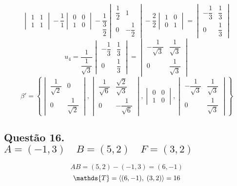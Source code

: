 \documentclass[12pt]{article}
\begin{document}
\[\begin{vmatrix} 1&1 \\ 1&1 \end{vmatrix} - \dfrac{1}{1}\begin{vmatrix} 0&0 \\ 1&0 \end{vmatrix} - \dfrac{1}{\dfrac{3}{2}}\begin{vmatrix} \dfrac{1}{2}&1 \\ 0&-\dfrac{1}{2} \end{vmatrix} - \dfrac{2}{2}\begin{vmatrix} 1&0 \\ 0&1 \end{vmatrix} = \begin{vmatrix} -\dfrac{1}{3}&\dfrac{1}{3} \\ 0&\dfrac{1}{3} \end{vmatrix}\]
\[u_{4} = \dfrac{1}{\dfrac{1}{\sqrt{3}}}\begin{vmatrix} -\dfrac{1}{3}&\dfrac{1}{3} \\ 0&\dfrac{1}{3} \end{vmatrix} = \begin{vmatrix} -\dfrac{1}{\sqrt{3}}&\dfrac{1}{\sqrt{3}} \\ 0&\dfrac{1}{\sqrt{3}} \end{vmatrix}\]
\[\beta' = \left\lbrace \begin{vmatrix} \dfrac{1}{\sqrt{2}}&0 \\ 0&\dfrac{1}{\sqrt{2}} \end{vmatrix}, \begin{vmatrix} \dfrac{1}{\sqrt{6}}&\dfrac{\sqrt{2}}{\sqrt{3}} \\ 0&-\dfrac{1}{\sqrt{6}} \end{vmatrix}, \begin{vmatrix} 0&0 \\ 1&0 \end{vmatrix}, \begin{vmatrix} -\dfrac{1}{\sqrt{3}}&\dfrac{1}{\sqrt{3}} \\ 0&\dfrac{1}{\sqrt{3}} \end{vmatrix} \right\rbrace\]

\subsection{Questão 16. $A = (-1,3) \quad B = (5,2) \quad F = (3,2)$}

\[AB = (5,2) - (-1,3) = (6, -1)\]
\[\mathds{T} = \p{(6,-1)}{(3,2)} = 16\]
\end{document}
